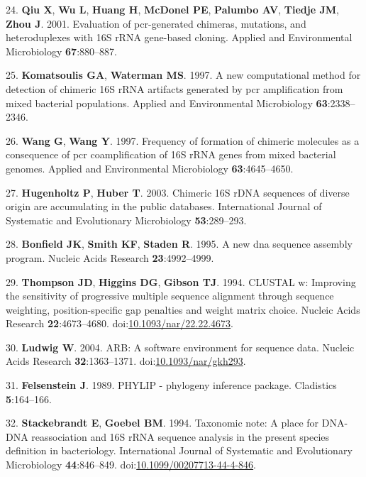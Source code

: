 \documentclass[11pt,]{article}
\begin{document}
\leavevmode\hypertarget{ref-Qiu2001}{}%
24. \textbf{Qiu X}, \textbf{Wu L}, \textbf{Huang H}, \textbf{McDonel
PE}, \textbf{Palumbo AV}, \textbf{Tiedje JM}, \textbf{Zhou J}. 2001.
Evaluation of pcr-generated chimeras, mutations, and heteroduplexes with
16S rRNA gene-based cloning. Applied and Environmental Microbiology
\textbf{67}:880--887.

\leavevmode\hypertarget{ref-Komatsoulis1997}{}%
25. \textbf{Komatsoulis GA}, \textbf{Waterman MS}. 1997. A new
computational method for detection of chimeric 16S rRNA artifacts
generated by pcr amplification from mixed bacterial populations. Applied
and Environmental Microbiology \textbf{63}:2338--2346.

\leavevmode\hypertarget{ref-Wang1997}{}%
26. \textbf{Wang G}, \textbf{Wang Y}. 1997. Frequency of formation of
chimeric molecules as a consequence of pcr coamplification of 16S rRNA
genes from mixed bacterial genomes. Applied and Environmental
Microbiology \textbf{63}:4645--4650.

\leavevmode\hypertarget{ref-Hugenholtz2003}{}%
27. \textbf{Hugenholtz P}, \textbf{Huber T}. 2003. Chimeric 16S rDNA
sequences of diverse origin are accumulating in the public databases.
International Journal of Systematic and Evolutionary Microbiology
\textbf{53}:289--293.

\leavevmode\hypertarget{ref-Bonfield1995}{}%
28. \textbf{Bonfield JK}, \textbf{Smith KF}, \textbf{Staden R}. 1995. A
new dna sequence assembly program. Nucleic Acids Research
\textbf{23}:4992--4999.

\leavevmode\hypertarget{ref-Thompson1994}{}%
29. \textbf{Thompson JD}, \textbf{Higgins DG}, \textbf{Gibson TJ}. 1994.
CLUSTAL w: Improving the sensitivity of progressive multiple sequence
alignment through sequence weighting, position-specific gap penalties
and weight matrix choice. Nucleic Acids Research \textbf{22}:4673--4680.
doi:\href{https://doi.org/10.1093/nar/22.22.4673}{10.1093/nar/22.22.4673}.

\leavevmode\hypertarget{ref-Ludwig2004}{}%
30. \textbf{Ludwig W}. 2004. ARB: A software environment for sequence
data. Nucleic Acids Research \textbf{32}:1363--1371.
doi:\href{https://doi.org/10.1093/nar/gkh293}{10.1093/nar/gkh293}.

\leavevmode\hypertarget{ref-Felsenstein1989}{}%
31. \textbf{Felsenstein J}. 1989. PHYLIP - phylogeny inference package.
Cladistics \textbf{5}:164--166.

\leavevmode\hypertarget{ref-Stackebrandt1994}{}%
32. \textbf{Stackebrandt E}, \textbf{Goebel BM}. 1994. Taxonomic note: A
place for DNA-DNA reassociation and 16S rRNA sequence analysis in the
present species definition in bacteriology. International Journal of
Systematic and Evolutionary Microbiology \textbf{44}:846--849.
doi:\href{https://doi.org/10.1099/00207713-44-4-846}{10.1099/00207713-44-4-846}.
\end{document}
